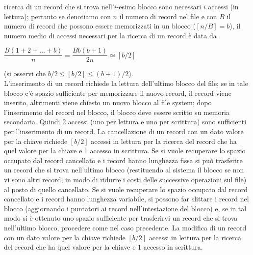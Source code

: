 ricerca di un record che si trova nell'$i$-esimo blocco sono necessari $i$ accessi (in lettura); 
pertanto se denotiamo con $n$ il numero di record nel file e con $B$ il numero di record che possono 
essere memorizzati in un blocco ($[n/B]=b$), il numero medio di accessi necessari per la ricerca di un 
record è data da
\begin{center}
$\dfrac{B(1+2+\ldots +b)}{n} = \dfrac{Bb(b+1)}{2n} \simeq [b/2]$ 
\end{center}
(si osservi che $b/2\leq[b/2] \leq (b+1)/2$).\\
L'inserimento di un record richiede la lettura dell'ultimo blocco del file; se in tale blocco c'è spazio
sufficiente per memorizzare il nuovo record, il record viene inserito, altrimenti viene chiesto un
nuovo blocco al file system; dopo l'inserimento del record nel blocco, il blocco deve essere scritto
su memoria secondaria. Quindi 2 accessi (uno per lettura e uno per scrittura) sono sufficienti per
l'inserimento di un record. La cancellazione di un record con un dato valore per la chiave richiede
$[b/2]$ accessi in lettura per la ricerca del record che ha quel valore per la chiave e 1 accesso in
scrittura. Se si vuole recuperare lo spazio occupato dal record cancellato e i record hanno lunghezza
fissa si può trasferire un record che si trova nell'ultimo blocco (restituendo al sistema il blocco se
non vi sono altri record, in modo di ridurre i costi delle successive operazioni sul file) al posto di
quello cancellato. Se si vuole recuperare lo spazio occupato dal record cancellato e i record hanno
lunghezza variabile, si possono far slittare i record nel blocco (aggiornando i puntatori ai record
nell'intestazione del blocco) e, se in tal modo si è ottenuto uno spazio sufficiente per trasferirvi un
record che si trova nell'ultimo blocco, procedere come nel caso precedente. La modifica di un
record con un dato valore per la chiave richiede $[b/2]$ accessi in lettura per la ricerca del record che
ha quel valore per la chiave e 1 accesso in scrittura.\\

